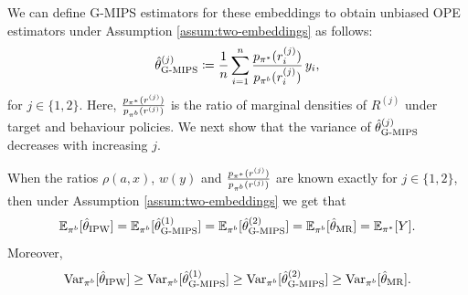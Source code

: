 We can define G-MIPS estimators for these embeddings to obtain unbiased OPE estimators under Assumption \ref{assum:two-embeddings} as follows:
\[    \hat{\theta}^{(j)}_{\textup{G-MIPS}} \coloneqq \frac{1}{n}\sum_{i=1}^n \frac{p_{\pi^*}(r_i^{(j)})}{p_{\pi^b}(r_i^{(j)})}\, y_i,
\]
for $j\in \{1, 2\}$. Here, $\frac{p_{\pi^*}(r^{(j)})}{p_{\pi^b}(r^{(j)})}$ is the ratio of marginal densities of $R^{(j)}$ under target and behaviour policies. 
We next show that the variance of $\hat{\theta}^{(j)}_{\textup{G-MIPS}}$ decreases with increasing $j$.
\begin{proposition}\label{prop:mips_generalised}
    When the ratios $\rho(a, x)$, $w(y)$ and $\frac{p_{\pi^*}(r^{(j)})}{p_{\pi^b}(r^{(j)})}$ are known exactly for $j \in \{1, 2\}$, then under Assumption \ref{assum:two-embeddings} we get that
    \[
    \mathbb{E}_{\pi^b}[\hat{\theta}_{\textup{IPW}}] = \mathbb{E}_{\pi^b}[\hat{\theta}^{(1)}_{\textup{G-MIPS}}] = \mathbb{E}_{\pi^b}[\hat{\theta}^{(2)}_{\textup{G-MIPS}}] = \mathbb{E}_{\pi^b}[\hat{\theta}_{\textup{MR}}] = \mathbb{E}_{\pi^*}[Y].
    \]
    Moreover, 
    \[
    \textup{Var}_{\pi^b}[\hat{\theta}_{\textup{IPW}}] \geq \textup{Var}_{\pi^b}[\hat{\theta}^{(1)}_{\textup{G-MIPS}}] \geq  \textup{Var}_{\pi^b}[\hat{\theta}^{(2)}_{\textup{G-MIPS}}] \geq \textup{Var}_{\pi^b}[\hat{\theta}_{\textup{MR}}].
    \]
\end{proposition}
